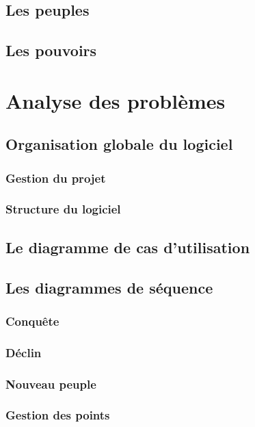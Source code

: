 \documentclass[11pt]{report}
\begin{document}
	\section{Les peuples}

	\section{Les pouvoirs}

\chapter{Analyse des problèmes}

	\section{Organisation globale du logiciel}

		\subsection{Gestion du projet}

		\subsection{Structure du logiciel}

	\section{Le diagramme de cas d'utilisation}

	\section{Les diagrammes de séquence}

		\subsection{Conquête}

		\subsection{Déclin}

		\subsection{Nouveau peuple}

		\subsection{Gestion des points}
\end{document}
